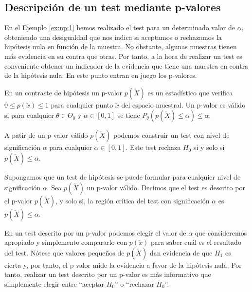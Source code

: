     \subsection{Descripción de un test mediante p-valores}

        En el Ejemplo \ref{ex:np:1} hemos realizado el test para un determinado valor de $\alpha$, obteniendo una desigualdad que nos indica si aceptamos o rechazamos la hipótesis nula en función de la muestra. No obstante, algunas muestras tienen más evidencia en su contra que otras. %
        Por tanto, a la hora de realizar un test es conveniente obtener un indicador de la evidencia que tiene una muestra en contra de la hipótesis nula. En este punto entran en juego los p-valores.

        \begin{definition}
            En un contraste de hipótesis un p-valor $p(\utilde{X})$ es un estadístico que verifica $0 \le p(\utilde{x}) \le 1$ para cualquier punto $\utilde{x}$ del espacio muestral. Un p-valor es válido si para cualquier $\theta \in \Theta_0$ y $\alpha \in [0,1]$ se tiene $P_\theta(p(\utilde{X}) \le \alpha) \le \alpha.$
        \end{definition}

        A patir de un p-valor válido $p(\utilde{X})$ podemos construir un test con nivel de significación $\alpha$ para cualquier $\alpha \in [0,1]$. Este test rechaza $H_0$ si y solo si $p(\utilde{X}) \le \alpha$.

        \begin{definition}
            Supongamos que un test de hipótesis se puede formular para cualquier nivel de significación $\alpha$. Sea $p(\utilde{X})$ un p-valor válido. Decimos que el test es descrito por el p-valor $p(\utilde{X})$, y solo si, la región crítica del test con significación $\alpha$ es $p(\utilde{X}) \le \alpha$.
        \end{definition}

        En un test descrito por un p-valor podemos elegir el valor de $\alpha$ que consideremos apropiado y simplemente compararlo con $p(\utilde{x})$ para saber cuál es el resultado del test. Nótese que valores pequeños de $p(\utilde{X})$ dan evidencia de que $H_1$ es cierta y, por tanto, el p-valor mide la evidencia a favor de la hipótesis nula. Por tanto, realizar un test descrito por un p-valor es más informativo que simplemente elegir entre ``aceptar $H_0$'' o ``rechazar $H_0$''.

